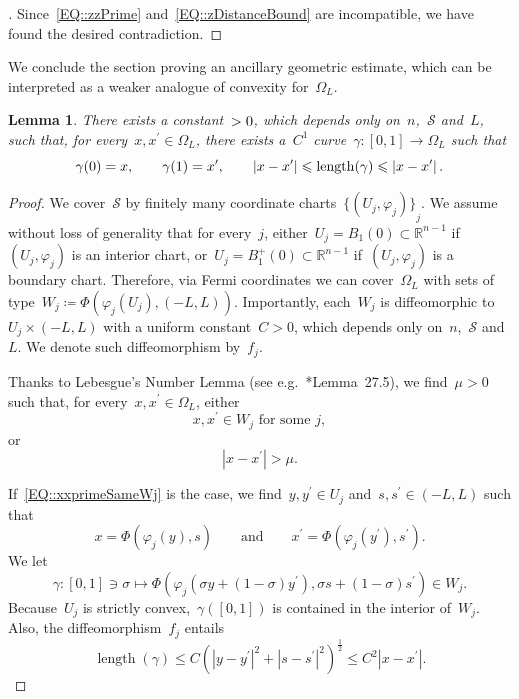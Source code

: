 \documentclass[12pt,a4paper]{amsart}
\makeatletter
\numberwithin{equation}{section}
\newtheorem{lemma}[theorem]{Lemma}
\theoremstyle{definition}
\theoremstyle{remark}
\newcommand{\R}{\mathbb{R}}
\newcommand{\abs}[1]{\left\lvert#1\right\rvert}
\renewcommand{\leq}{\leqslant}
\newcommand{\constapp}[1]{%
  \csname constapp@#1\endcsname%
}
\makeatother
\begin{document}
\begin{appendix}
\begin{proof}[]
    Since~\eqref{EQ::zzPrime} and~\eqref{EQ::zDistanceBound} are incompatible, we have found the desired contradiction.
\end{proof}

We conclude the section proving an ancillary geometric estimate, which can be interpreted as a weaker analogue of convexity for~$\Omega_L$.
\begin{lemma}\label{LEM::Quasiconvexity}
    There exists a constant~$\constapp{CONST::Quasiconvexity} >0$, which depends only on~$n$,~$\mathcal{S}$ and~$L$, such that, for every~$x,x^\prime \in \Omega_L$, there exists a~$C^1$ curve~$\gamma \colon [0,1] \to \Omega_L$ such that
    \begin{equation}\label{EQ::QuasiconvexityInequality}
        \gamma(0)=x,\qquad\gamma(1)=x^\prime,\qquad\abs{x-x^\prime}\leq\operatorname{length}(\gamma)\leq \constapp{CONST::Quasiconvexity} \abs{x-x^\prime}.
    \end{equation}
\end{lemma}
\begin{proof}
    We cover~$\mathcal{S}$ by finitely many coordinate charts~${\{(U_j, \varphi_j)\}}_j$. We assume without loss of generality that for every~$j$, either~$U_j= B_1(0) \subset \R^{n-1}$ if~$(U_j, \varphi_j)$ is an interior chart, or~$U_j = B_1^+(0) \subset \R^{n-1}$ if~$(U_j, \varphi_j)$ is a boundary chart. Therefore, via Fermi coordinates we can cover~$\Omega_L$ with sets of type~$W_j \coloneq \Phi(\varphi_j(U_j),(-L,L))$. Importantly, each~$W_j$ is diffeomorphic to~$U_j \times (-L,L)$ with a uniform constant~$C > 0$, which depends only on~$n$,~$\mathcal{S}$ and~$L$. We denote such diffeomorphism by~$f_j$.

    Thanks to Lebesgue's Number Lemma (see e.g.~\cite{MR3728284}*{Lemma~27.5}), we find~$\mu > 0$ such that, for every~$x,x^\prime \in \Omega_L$, either
    \begin{equation}\label{EQ::xxprimeSameWj}
        x,x^\prime\in W_j\text{ for some }j,
    \end{equation}
    or
    \begin{equation}\label{EQ::xxprimeFar}
        \abs{x-x^\prime} > \mu.
    \end{equation}

    If~\eqref{EQ::xxprimeSameWj} is the case, we find~$y,y^\prime \in U_j$ and~$s,s^\prime \in (-L,L)$ such that
    \[x=\Phi(\varphi_j(y),s)\qquad \text{and}\qquad x^\prime = \Phi(\varphi_j(y^\prime),s^\prime).\]
    We let
    \begin{equation}
        \gamma \colon [0,1] \ni \sigma \longmapsto \Phi(\varphi_j(\sigma y + (1-\sigma)y^\prime), \sigma s + (1-\sigma)s^\prime) \in W_j.
    \end{equation}
    Because~$U_j$ is strictly convex,~$\gamma([0,1])$ is contained in the interior of~$W_j$. Also, the diffeomorphism~$f_j$ entails
    \begin{equation}\label{EQ::gammaLengthNear}
        \operatorname{length}(\gamma) \leq C{\left(\abs{y-y^\prime}^2 + \abs{s-s^\prime}^2\right)}^{\frac{1}{2}} \leq C^2 \abs{x-x^\prime}.
    \end{equation}


\end{proof}
\end{appendix}
\end{document}
